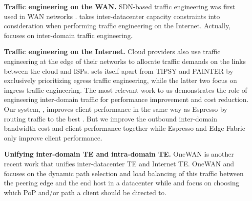 \noindent \textbf{Traffic engineering on the WAN.}
SDN-based traffic engineering was first used in WAN networks \cite{hong2013achieving,jain2013B4,li2018trafficshaper,hong2018b4,kandula2014calendaring,laoutaris2011inter,liu2014traffic,jalaparti2016dynamicPretium,krishnaswamy2023onewan,bogle2019teavar}. {\sys} takes inter-datacenter capacity constraints into consideration when performing traffic engineering on the Internet. Actually, {\sys} focuses on inter-domain traffic engineering.

\noindent \textbf{Traffic engineering on the Internet.}
Cloud providers also use traffic engineering at the edge of their networks to allocate traffic demands on the links between the cloud and ISPs. {\sys} sets itself apart from TIPSY \cite{markovitch2022tipsy} and PAINTER \cite{koch2023painter} by exclusively prioritizing egress traffic engineering, while the latter two focus on ingress traffic engineering. The most relevant work to us demonstrates the role of engineering inter-domain traffic for performance improvement \cite{yap2017espresso,schlinker2017edgefabric,landa2021staying,zhang2010optimizingEntact,liu2016Footprint,gupta2014sdx} and cost reduction\cite{singh2021costCascara,goldenberg2004optimizing}.
Our system, {\sys}, improves client performance in the same way as Espresso \cite{yap2017espresso} by routing traffic to the best {\egress}. But we improve the outbound inter-domain bandwidth cost and client performance together while Espresso \cite{yap2017espresso} and Edge Fabric \cite{schlinker2017edgefabric} only improve client performance. 

\noindent \textbf{Unifying inter-domain TE and intra-domain TE.} OneWAN \cite{krishnaswamy2023onewan} is another recent work that unifies inter-datacenter TE and Internet TE. OneWAN \cite{krishnaswamy2023onewan} and \cite{chen2015end,flavel2015fastroute,zhang2010optimizingEntact} focuses on the dynamic path selection and load balancing of this traffic between the peering edge and the end host in a datacenter while {\sys} and \cite{liu2016Footprint,valancius2013PECAN,zhang2010optimizingEntact,singh2021costCascara,yap2017espresso,caesar2005design, feamster2003guidelines, gupta2014sdx, schlinker2017edgefabric} focus on choosing which PoP and/or path a client should be directed to.


